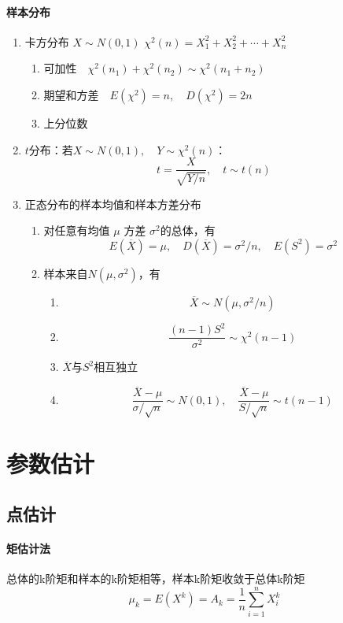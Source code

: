 \documentclass[12pt]{report}
\begin{document}
\paragraph{样本分布}
\begin{enumerate}
    \item 卡方分布 $X\sim N(0,1)$ $\chi^2(n)=X^2_1+X^2_2+\cdots +X^2_n$
    \begin{enumerate}
        \item 可加性$\quad \chi^2(n_1)+\chi^2(n_2) \sim \chi^2(n_1+n_2)$
        \item 期望和方差$\quad E(\chi^2)=n,\quad D(\chi^2)=2n$
        \item 上分位数
    \end{enumerate}
    \item $t$分布：若$X \sim N(0,1),\quad Y \sim \chi^2(n)$：$$t={\frac{X}{\sqrt{Y/n}}},\quad t \sim t(n)$$
    \item 正态分布的样本均值和样本方差分布
    \begin{enumerate}
    \item 对任意有均值 $\mu$ 方差 $\sigma^2$的总体，有$$E(\overline{X})= \mu,\quad D(\overline{X})=\sigma^2/n,\quad E(S^2)=\sigma^2$$
        \item 样本来自$N(\mu,\sigma^2)$，有
        \begin{enumerate}
            \item $$\overline{X} \sim N(\mu,\sigma^2/n)$$
            \item $$\frac{(n-1)S^2}{\sigma^2} \sim \chi^2(n-1)$$
            \item $\overline{X}$与$S^2$相互独立
            \item $$\frac{\overline{X}-\mu}{\sigma/\sqrt{n}} \sim N(0,1),\quad \frac{\overline{X}-\mu}{S/\sqrt{n}} \sim t(n-1)$$
        \end{enumerate}
    \end{enumerate}
\end{enumerate}

\section{参数估计}
\subsection{点估计}

\paragraph{矩估计法}
总体的k阶矩和样本的k阶矩相等，样本k阶矩收敛于总体k阶矩
$$\mu_k=E(X^k)=A_k=\frac{1}{n}\sum_{i=1}^n X_i^k$$
\end{document}
